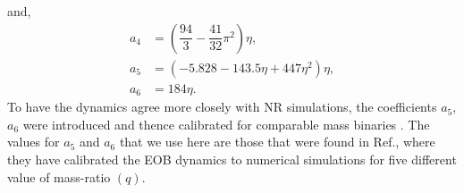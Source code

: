 \documentclass[aps,
prd,
amsmath,
amssymb,
twocolumn,
floatfix,
groupedaddress]{revtex4-1}
\begin{document}
and,
\begin{subequations}\label{metric_tunable_coeffs}
\begin{align}
a_4 &= \left(\dfrac{94}{3} - \dfrac{41}{32}\pi^2\right)\eta ,\\
a_5 &= \left(-5.828 - 143.5\eta + 447\eta^2\right)\eta ,\\
a_6 &= 184\eta .
\end{align}
\end{subequations}
To have the dynamics agree more closely with NR simulations, the coefficients $a_5$, $a_6$ were introduced and thence calibrated for comparable mass binaries \citep{EOBNRdevel01,EOBNRdevel02,EOBNRdevel03,EOBNRdevel04}. The values for $a_5$ and $a_6$ that we use here are those that were found in Ref.\citep{BuonannoEOBv2Main}, where they have calibrated the EOB dynamics to numerical simulations for five different value of mass-ratio $(q)$.
\end{document}

